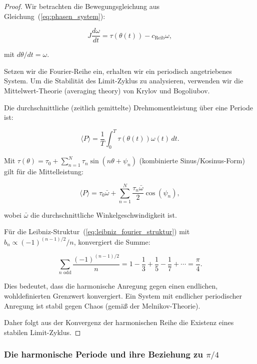 \documentclass[a4paper,12pt]{article}
\theoremstyle{definition}
\begin{document}
\begin{proof}
  Wir betrachten die Bewegungsgleichung aus Gleichung~(\ref{eq:phasen_system}):
  
  \begin{equation}
    J \frac{d\omega}{dt} = \tau(\theta(t)) - c_{\text{Reib}} \omega,
  \end{equation}
  
  mit $d\theta/dt = \omega$.
  
  Setzen wir die Fourier-Reihe ein, erhalten wir ein periodisch angetriebenes System. Um die Stabilität des Limit-Zyklus zu analysieren, verwenden wir die Mittelwert-Theorie (averaging theory) von Krylov und Bogoliubov.
  
  Die durchschnittliche (zeitlich gemittelte) Drehmomentleistung über eine Periode ist:
  
  \begin{equation}
    \langle P \rangle = \frac{1}{T} \int_0^T \tau(\theta(t)) \omega(t) \, dt.
  \end{equation}
  
  Mit $\tau(\theta) = \tau_0 + \sum_{n=1}^{N} \tau_n \sin(n\theta + \psi_n)$ (kombinierte Sinus/Kosinus-Form) gilt für die Mittelleistung:
  
  \begin{equation}
    \langle P \rangle = \tau_0 \bar{\omega} + \sum_{n=1}^{N} \frac{\tau_n \bar{\omega}}{2} \cos(\psi_n),
  \end{equation}
  
  wobei $\bar{\omega}$ die durchschnittliche Winkelgeschwindigkeit ist.
  
  Für die Leibniz-Struktur~(\ref{eq:leibniz_fourier_struktur}) mit $b_n \propto (-1)^{(n-1)/2}/n$, konvergiert die Summe:
  
  \begin{equation}
    \sum_{n \text{ odd}} \frac{(-1)^{(n-1)/2}}{n} = 1 - \frac{1}{3} + \frac{1}{5} - \frac{1}{7} + \cdots = \frac{\pi}{4}.
  \end{equation}
  
  Dies bedeutet, dass die harmonische Anregung gegen einen endlichen, wohldefinierten Grenzwert konvergiert. Ein System mit endlicher periodischer Anregung ist stabil gegen Chaos (gemäß der Melnikov-Theorie).
  
  Daher folgt aus der Konvergenz der harmonischen Reihe die Existenz eines stabilen Limit-Zyklus.
\end{proof}

\subsubsection{Die harmonische Periode und ihre Beziehung zu $\pi/4$}
\end{document}
